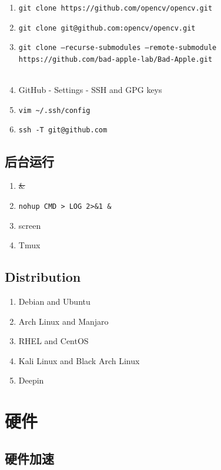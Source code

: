 \documentclass[a4paper]{article}
\begin{document}
\begin{enumerate}[leftmargin=1cm, itemindent=1cm]
    \item {\tt git clone https://github.com/opencv/opencv.git}
    \item {\tt git clone git@github.com:opencv/opencv.git}
    \item {\tt git clone --recurse-submodules --remote-submodule https://github.com/bad-apple-lab/Bad-Apple.git}
    \\ \quad \\
    \item GitHub - Settings - SSH and GPG keys
    \item {\tt vim \textasciitilde/.ssh/config}
    \item {\tt ssh -T git@github.com}
\end{enumerate}

\subsection{\LARGE 后台运行}

\begin{enumerate}[leftmargin=1cm, itemindent=1cm]
    \item \sout{\&}
    \item {\tt nohup CMD > LOG 2>\&1 \&}
    \item screen
    \item Tmux
\end{enumerate}

\subsection{\LARGE Distribution}

\begin{enumerate}[leftmargin=1cm, itemindent=1cm]
    \item Debian and Ubuntu
    \item Arch Linux and Manjaro
    \item RHEL and CentOS
    \item Kali Linux and Black Arch Linux
    \item Deepin
\end{enumerate}

\section{\LARGE 硬件}

\subsection{\LARGE 硬件加速}
\end{document}
